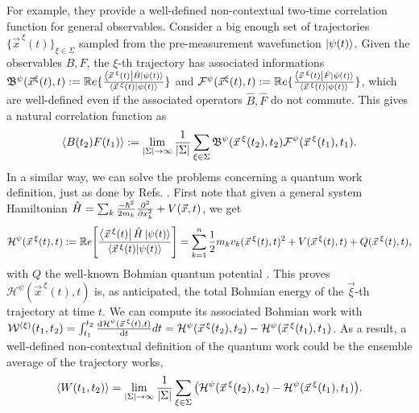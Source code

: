 \documentclass[11pt, a4paper]{article} %
\newcommand{\R}{\mathbb{R}} %
\newcommand{\B}{\mathfrak{B}}
\begin{document}
For example, they provide a well-defined non-contextual two-time correlation function for general observables. Consider a big enough set of trajectories $\{\vec{x}^{\:\xi}(t)\}_{\xi\in \Sigma}$ sampled from the pre-measurement wavefunction $\ket{\psi(t)}$. Given the observables $B,F$, the $\xi$-th trajectory has associated informations $\B^\psi(\vec{x}^\xi(t),t):=\R e\{\frac{\bra{\vec{x}^{\:\xi}(t)}\hat{B}\ket{\psi(t)}}{\bra{\vec{x}^{\:\xi}(t)}\ket{\psi(t)}} \}$ and $\mathcal{F}^\psi(\vec{x}^\xi(t),t):=\R e\{\frac{\bra{\vec{x}^{\:\xi}(t)}\hat{F}\ket{\psi(t)}}{\bra{\vec{x}^{\:\xi}(t)}\ket{\psi(t)}} \}$, which are well-defined even if the associated operators $\hat{B},\hat{F}$ do not commute. This gives a natural correlation function as \vspace{-0.12cm}
\begin{equation}
\langle B(t_2)F(t_1)\rangle := \lim_{|\Sigma|\rightarrow \infty}\frac{1}{|\Sigma|} \sum_{\xi\in\Sigma} \B^\psi(\vec{x}^{\:\xi}(t_2),t_2)\mathcal{F}^\psi(\vec{x}^{\:\xi}(t_1),t_1).\vspace{-0.12cm}
\end{equation}
 In a similar way, we can solve the problems concerning a quantum work definition, just as done by Refs. \cite{work1, work2}. First note that given a general system Hamiltonian $\hat{H}=\sum_k \frac{-\hbar^2}{2m_k}\pdv[2]{}{x_k}+V(\vec{x},t)$, we get\vspace{-0.15cm}
\begin{equation}
\mathcal{H}^\psi(\vec{x}^{\:\xi}(t),t) := \mathbb{R}e\qty[ \frac{\bra{\vec{x}^{\:\xi}(t)}\hat{H}\ket{\psi(t)}}{\bra{\vec{x}^{\:\xi}(t)}\ket{\psi(t)}} ] = \sum_{k=1}^n\frac{1}{2}m_kv_k(\vec{x}^{\:\xi}(t),t)^2+V(\vec{x}^{\:\xi}(t),t)+Q(\vec{x}^{\:\xi}(t),t),\vspace{-0.15cm}
\end{equation}
with $Q$ the well-known Bohmian quantum potential \cite{Holland, Durr, JordiXavier}. This proves $\mathcal{H}^\psi(\vec{x}^{\:\xi}(t),t)$ is, as anticipated, the total Bohmian energy of the $\vec{\xi}$-th trajectory at time $t$. We can compute its associated Bohmian work with $\mathcal{W}^{(\xi)}(t_1,t_2)= \int_{t_1}^{t_2}\dv{\mathcal{H}^\psi(\vec{x}^{\:\xi}(t),t)}{t}dt=\mathcal{H}^\psi(\vec{x}^{\:\xi}(t_2),t_2)-\mathcal{H}^\psi(\vec{x}^{\:\xi}(t_1),t_1)$. As a result, a well-defined non-contextual definition of the quantum work could be the ensemble average of the trajectory works,\vspace{-0.1cm}
\begin{equation}
\langle W(t_1,t_2)\rangle = \lim_{|\Sigma|\rightarrow \infty}\frac{1}{|\Sigma|} \sum_{\xi\in\Sigma} \qty(\mathcal{H}^\psi(\vec{x}^{\:\xi}(t_2),t_2)-\mathcal{H}^\psi(\vec{x}^{\:\xi}(t_1),t_1)).\vspace{-0.1cm}
\end{equation}
\end{document}
